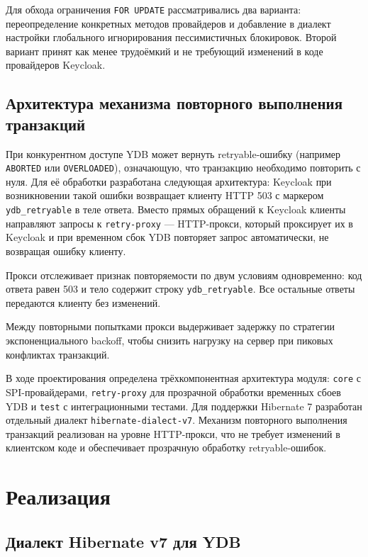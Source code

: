 \documentclass[times]{itmo-student-thesis}
\begin{document}
Для обхода ограничения \texttt{FOR UPDATE} рассматривались два варианта:
переопределение конкретных методов провайдеров и добавление в диалект
настройки глобального игнорирования пессимистичных блокировок. Второй вариант принят как
менее трудоёмкий и не требующий изменений в коде провайдеров Keycloak.

\section{Архитектура механизма повторного выполнения транзакций}

При конкурентном доступе YDB может вернуть retryable-ошибку
(например \texttt{ABORTED} или \texttt{OVERLOADED}), означающую, что транзакцию
необходимо повторить с нуля.
Для её обработки разработана следующая архитектура: Keycloak при возникновении
такой ошибки возвращает клиенту HTTP 503 с маркером \texttt{ydb\_retryable}
в теле ответа. Вместо прямых обращений к Keycloak клиенты направляют запросы к
\texttt{retry-proxy} --- HTTP-прокси, который проксирует их в Keycloak
и при временном сбок YDB повторяет запрос автоматически, не возвращая ошибку клиенту.

Прокси отслеживает признак повторяемости по двум условиям одновременно:
код ответа равен 503 и тело содержит строку \texttt{ydb\_retryable}.
Все остальные ответы передаются клиенту без изменений.

Между повторными попытками прокси выдерживает задержку
по стратегии экспоненциального backoff, чтобы снизить нагрузку на сервер при пиковых конфликтах транзакций.

\chapterconclusion

В ходе проектирования определена трёхкомпонентная архитектура модуля: \texttt{core}
с SPI-провайдерами, \texttt{retry-proxy} для прозрачной обработки временных сбоев YDB
и \texttt{test} с интеграционными тестами. Для поддержки Hibernate 7 разработан отдельный
диалект \texttt{hibernate-dialect-v7}. Механизм повторного выполнения транзакций реализован
на уровне HTTP-прокси, что не требует изменений в клиентском коде и обеспечивает прозрачную
обработку retryable-ошибок.

\chapter{Реализация}

\section{Диалект Hibernate v7 для YDB}
\end{document}
